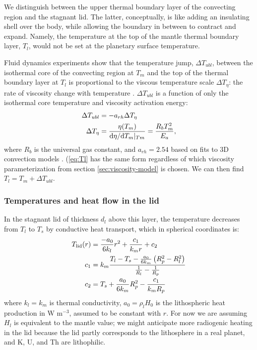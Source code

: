 We distinguish between the upper thermal boundary layer of the convecting region and the stagnant lid.  The latter, conceptually, is like adding an insulating shell over the body, while allowing the boundary in between to contract and expand. Namely, the temperature at the top of the mantle thermal boundary layer, $T_l$, would not be set at the planetary surface temperature. 

Fluid dynamics experiments show that the temperature jump, $\Delta T_{ubl}$, between the isothermal core of the convecting region at $T_m$ and the top of the thermal boundary layer at $T_l$ is proportional to the viscous temperature scale $\Delta T_\eta$: the rate of viscosity change with temperature \citep{Davaille1993}. $\Delta T_{ubl}$ is a function of only the isothermal core temperature and viscosity activation energy:
\begin{align}
\label{eq:Tl}
\Delta T_{ubl} &= -a_{rh} \Delta T_{\eta} \\
\Delta T_{\eta} &= \frac{\eta(T_m)}{{\rm d}\eta/{\rm d}T_m\vert_{Tm}} = \frac{R_b T_m^2}{E_a},
\end{align}
where $R_b$ is the universal gas constant, and $a_{rh} = 2.54$ based on fits to 3D convection models \citep{Thiriet2019}. (\ref{eq:Tl} has the same form regardless of which viscosity parameterization from section \ref{sec:viscosity-model} is chosen. We can then find $T_l = T_m + \Delta T_{ubl}$.

\subsubsection{Temperatures and heat flow in the lid}

In the stagnant lid of thickness $d_l$ above this layer, the temperature decreases from $T_l$ to $T_s$ by conductive heat transport, which in spherical coordinates is:
\begin{align}
T_{\rm lid}(r) &= \frac{-a_0}{6k_l} r^2 + \frac{c_1}{k_m r} + c_2 \\
    c_1 &= k_m \frac{T_l - T_s - \frac{a_0}{6 k_m} \left(R_p^2 - R_l^2\right)}{\frac{1}{R_l} - \frac{1}{R_p}} \\
    c_2 &= T_s + \frac{a_0}{6 k_m} R_p^2 - \frac{c_1}{k_m R_p}
\end{align} 
where $k_l = k_m$ is thermal conductivity, $a_0 = \rho_l H_0$ is the lithospheric heat production in W m$^{-3}$, assumed to be constant with $r$. For now we are assuming $H_l$ is equivalent to the mantle value; we might anticipate more radiogenic heating in the lid because the lid partly corresponds to the lithosphere in a real planet, and K, U, and Th are lithophilic.

